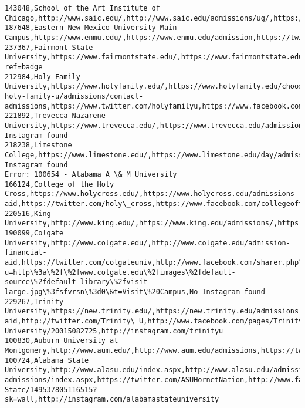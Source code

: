 \documentclass[11pt]{article}
\begin{document}
\begin{Verbatim}[commandchars=\\\{\}]
143048,School of the Art Institute of Chicago,http://www.saic.edu/,http://www.saic.edu/admissions/ug/,https://twitter.com/saic\_news\#act,http://www.facebook.com/saic.events\#act,http://instagram.com/saicpics\#\#act
187648,Eastern New Mexico University-Main Campus,https://www.enmu.edu/,https://www.enmu.edu/admission,https://twitter.com/enmu,https://www.facebook.com/goenmu,https://www.instagram.com/enmu
237367,Fairmont State University,https://www.fairmontstate.edu/,https://www.fairmontstate.edu/admit/,https://twitter.com/fairmontstate,https://www.facebook.com/FairmontState,https://instagram.com/fairmontstate?ref=badge
212984,Holy Family University,https://www.holyfamily.edu/,https://www.holyfamily.edu/choosing-holy-family-u/admissions/contact-admissions,https://www.twitter.com/holyfamilyu,https://www.facebook.com/HolyFamilyUniversity,https://www.instagram.com/holyfamilyu/
221892,Trevecca Nazarene University,https://www.trevecca.edu/,https://www.trevecca.edu/admissions,https://twitter.com/Trevecca,http://www.facebook.com/treveccanazarene,No Instagram found
218238,Limestone College,https://www.limestone.edu/,https://www.limestone.edu/day/admissions,https://twitter.com/at\_LimestoneCo,https://www.facebook.com/LimestoneCollege,No Instagram found
Error: 100654 - Alabama A \& M University
166124,College of the Holy Cross,https://www.holycross.edu/,https://www.holycross.edu/admissions-aid,https://twitter.com/holy\_cross,https://www.facebook.com/collegeoftheholycross,http://instagram.com/collegeoftheholycross
220516,King University,http://www.king.edu/,https://www.king.edu/admissions/,https://twitter.com/KingUnivBristol,https://www.facebook.com/kutornado,https://instagram.com/kinguniversity/
190099,Colgate University,http://www.colgate.edu/,http://www.colgate.edu/admission-financial-aid,https://twitter.com/colgateuniv,http://www.facebook.com/sharer.php?u=http\%3a\%2f\%2fwww.colgate.edu\%2fimages\%2fdefault-source\%2fdefault-library\%2fvisit-large.jpg\%3fsfvrsn\%3d0\&t=Visit\%20Campus,No Instagram found
229267,Trinity University,https://new.trinity.edu/,https://new.trinity.edu/admissions-aid,http://twitter.com/Trinity\_U,http://www.facebook.com/pages/Trinity-University/20015082725,http://instagram.com/trinityu
100830,Auburn University at Montgomery,http://www.aum.edu/,http://www.aum.edu/admissions,https://twitter.com/aumontgomery,https://www.facebook.com/auburnmontgomery,https://www.instagram.com/auburnmontgomery/
100724,Alabama State University,http://www.alasu.edu/index.aspx,http://www.alasu.edu/admissions/undergrad-admissions/index.aspx,https://twitter.com/ASUHornetNation,http://www.facebook.com/pages/Alabama-State/149537805116515?sk=wall,http://instagram.com/alabamastateuniversity

\end{Verbatim}
\end{document}

